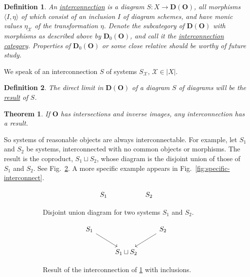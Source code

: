 \documentclass[10pt,a4paper,twocolumn]{article}
\newtheorem{theorem}{Theorem}
\newtheorem*{definition*}{Definition}
\newcommand{\X}{\mathcal{X}}
\newcommand{\Ocat}{\mathbf{O}}          %
\newcommand{\Dcat}{\mathbf{D}}          %
\begin{document}
\begin{definition*}
  An \underline{interconnection} is a diagram $S\colon X \to \Dcat(\Ocat)$, all morphisms $\langle I,\eta\rangle$ of which consist of an inclusion $I$ of diagram schemes, and have monic values $\eta_{\X}$ of the transformation $\eta$.
  Denote the subcategory of $\Dcat(\Ocat)$ with morphisms as described above by $\Dcat_{0}(\Ocat)$, and call it the \underline{interconnection category}.
  Properties of $\Dcat_{0}(\Ocat)$ or some close relative should be worthy of future study.
\end{definition*}

We speak of an interconnection $S$ of systems $S_{\X}$, $\X\in|X|$.

\begin{definition*}
  The direct limit in $\Dcat(\Ocat)$ of a diagram $S$ of diagrams will be the \underline{result} of $S$.
\end{definition*}

\begin{theorem}\label{thm:interconnect}
  If $\Ocat$ has intersections and inverse images, any interconnection has a result.
\end{theorem}

So systems of reasonable objects are always interconnectable.
For example, let $S_{1}$ and $S_{2}$ be systems, interconnected with no common objects or morphisms.
The result is the coproduct, $S_{1}\sqcup S_{2}$, whose diagram is the disjoint union of those of $S_{1}$ and $S_{2}$.
See Fig.~\ref{fig:disjoint-union}.
A more specific example appears in Fig.~\ref{fig:specific-interconnect}.

\begin{figure}
  \begin{subfigure}{\linewidth}
    \begin{equation*}
      \begin{tikzcd}
        {S_1} && {S_2}
      \end{tikzcd}
    \end{equation*}
    \caption{\footnotesize Disjoint union diagram for two systems $S_{1}$ and $S_{2}$.}
    \label{fig:disjoint-union-a}
  \end{subfigure}
  \begin{subfigure}{\linewidth}
    \begin{equation*}
      \begin{tikzcd}
        {S_1} && {S_2} \\
        & {S_1 \sqcup S_2}
        \arrow[from=1-1, to=2-2]
        \arrow[from=1-3, to=2-2]
      \end{tikzcd}
    \end{equation*}
    \caption{Result of the interconnection of \ref{fig:disjoint-union-a} with inclusions.}
  \end{subfigure}
  \caption{}
  \label{fig:disjoint-union}
\end{figure}
\end{document}
